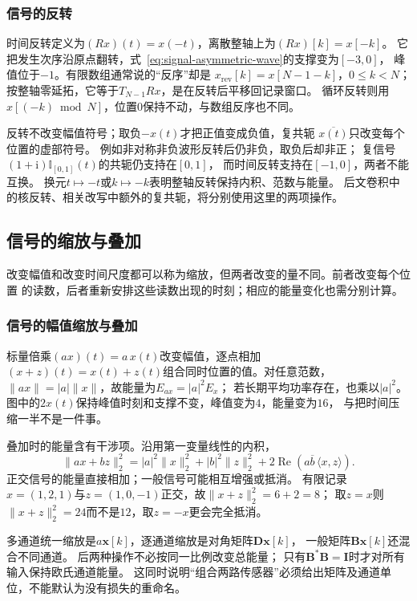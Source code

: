 \subsubsection{信号的反转}

时间反转定义为$(Rx)(t)=x(-t)$，离散整轴上为$(Rx)[k]=x[-k]$。
它把发生次序沿原点翻转，式~\eqref{eq:signal-asymmetric-wave}的支撑变为$[-3,0]$，
峰值位于$-1$。有限数组通常说的“反序”却是
$x_{\mathrm{rev}}[k]=x[N-1-k]$，$0\leq k<N$；
按整轴零延拓，它等于$T_{N-1}Rx$，是在反转后平移回记录窗口。
循环反转则用$x[(-k)\bmod N]$，位置$0$保持不动，与数组反序也不同。

反转不改变幅值符号；取负$-x(t)$才把正值变成负值，复共轭
$\overline{x(t)}$只改变每个位置的虚部符号。
例如非对称非负波形反转后仍非负，取负后却非正；
复信号$(1+\mathrm i)\mathbb I_{[0,1]}(t)$的共轭仍支持在$[0,1]$，
而时间反转支持在$[-1,0]$，两者不能互换。
换元$t\mapsto-t$或$k\mapsto-k$表明整轴反转保持内积、范数与能量。
后文卷积中的核反转、相关改写中额外的复共轭，将分别使用这里的两项操作。

\subsection{信号的缩放与叠加}

改变幅值和改变时间尺度都可以称为缩放，但两者改变的量不同。前者改变每个位置
的读数，后者重新安排这些读数出现的时刻；相应的能量变化也需分别计算。

\subsubsection{信号的幅值缩放与叠加}

标量倍乘$(ax)(t)=a\,x(t)$改变幅值，逐点相加
$(x+z)(t)=x(t)+z(t)$组合同时位置的值。对任意范数，
$\|ax\|=|a|\|x\|$，故能量为$E_{ax}=|a|^2E_x$；
若长期平均功率存在，也乘以$|a|^2$。
图中的$2x(t)$保持峰值时刻和支撑不变，峰值变为$4$，能量变为$16$，
与把时间压缩一半不是一件事。

叠加时的能量含有干涉项。沿用第一变量线性的内积，
\[
  \|ax+bz\|_2^2
  =|a|^2\|x\|_2^2+|b|^2\|z\|_2^2
   +2\operatorname{Re}\!\left(a\overline b\,\langle x,z\rangle\right).
\]
正交信号的能量直接相加；一般信号可能相互增强或抵消。
有限记录$x=(1,2,1)$与$z=(1,0,-1)$正交，故$\|x+z\|_2^2=6+2=8$；
取$z=x$则$\|x+z\|_2^2=24$而不是$12$，取$z=-x$更会完全抵消。

多通道统一缩放是$a\bm x[k]$，逐通道缩放是对角矩阵$\bm D\bm x[k]$，
一般矩阵$\bm B\bm x[k]$还混合不同通道。
后两种操作不必按同一比例改变总能量；
只有$\bm B^*\bm B=\bm I$时才对所有输入保持欧氏通道能量。
这同时说明“组合两路传感器”必须给出矩阵及通道单位，不能默认为没有损失的重命名。

